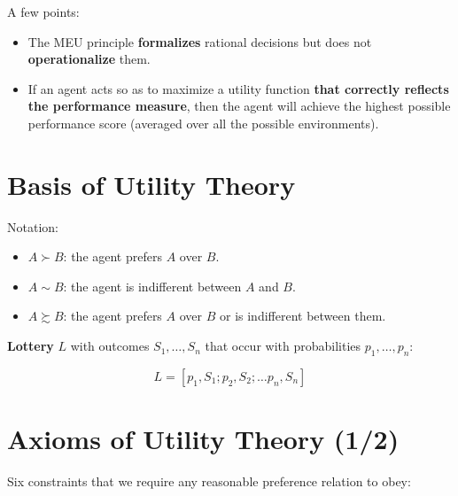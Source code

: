 \documentclass[11pt]{article}
\begin{document}
A few points:

\begin{itemize}
\item The MEU principle \textbf{formalizes} rational decisions but does not \textbf{operationalize} them.

\item If an agent acts so as to maximize a utility function \textbf{that correctly reflects the performance measure}, then the agent will achieve the highest possible performance score (averaged over all the possible environments).
\end{itemize}
\section{Basis of Utility Theory}
\label{sec:orgc5e450f}

Notation:

\begin{itemize}
\item \(A \succ B\): the agent prefers \(A\) over \(B\).
\item \(A \sim B\): the agent is indifferent between \(A\) and \(B\).
\item \(A \succsim B\): the agent prefers \(A\) over \(B\) or is indifferent between them.
\end{itemize}

\textbf{Lottery} \(L\) with outcomes \(S_1, \dots, S_n\) that occur with probabilities \(p_1, \dots, p_n\):

\begin{equation*}
L = [p_1, S_1; p_2, S_2; \dots p_n, S_n]
\end{equation*}
\section{Axioms of Utility Theory (1/2)}
\label{sec:orgc51b3e0}

Six constraints that we require any reasonable preference relation to obey:
\end{document}
